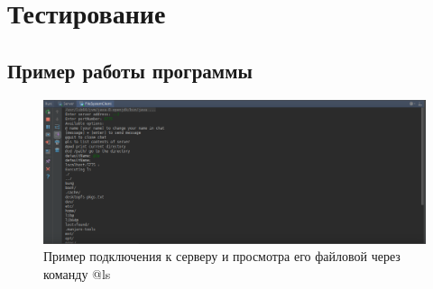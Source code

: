 \documentclass{article}
\begin{document}
\section{Тестирование}

\subsection{Пример работы программы}
\begin{figure}[H]
	\begin{flushleft}
		\centerline{\includegraphics[scale=0.6]{lab11_client.png}}
		\caption{Пример подключения к серверу и просмотра его файловой через команду @ls}
	\end{flushleft}
\end{figure}
\end{document}
